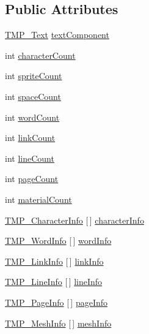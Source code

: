 \subsection*{Public Attributes}
\begin{DoxyCompactItemize}
\item 
\mbox{\hyperlink{class_t_m_pro_1_1_t_m_p___text}{T\+M\+P\+\_\+\+Text}} \mbox{\hyperlink{class_t_m_pro_1_1_t_m_p___text_info_ab23d67636c516cc8bd985f7e0904d3d9}{text\+Component}}
\item 
int \mbox{\hyperlink{class_t_m_pro_1_1_t_m_p___text_info_a8e78eb9b556174b94f41918799a1b85d}{character\+Count}}
\item 
int \mbox{\hyperlink{class_t_m_pro_1_1_t_m_p___text_info_a0b176c87b6ba6fd91c22adb1bd7f780a}{sprite\+Count}}
\item 
int \mbox{\hyperlink{class_t_m_pro_1_1_t_m_p___text_info_ae7e41800a8dba2853e71bd357e79319f}{space\+Count}}
\item 
int \mbox{\hyperlink{class_t_m_pro_1_1_t_m_p___text_info_ac2bb20330e0efa71d8fecd90c783fe65}{word\+Count}}
\item 
int \mbox{\hyperlink{class_t_m_pro_1_1_t_m_p___text_info_aeab9550ef458ae133cd9d8bcb6c27a43}{link\+Count}}
\item 
int \mbox{\hyperlink{class_t_m_pro_1_1_t_m_p___text_info_a7a77f5e9e979808b269dae5501bb7697}{line\+Count}}
\item 
int \mbox{\hyperlink{class_t_m_pro_1_1_t_m_p___text_info_a201730f545fe082335a1bb5a7ae8cd87}{page\+Count}}
\item 
int \mbox{\hyperlink{class_t_m_pro_1_1_t_m_p___text_info_a7658d04113158c9974dc48c867efd6d5}{material\+Count}}
\item 
\mbox{\hyperlink{struct_t_m_pro_1_1_t_m_p___character_info}{T\+M\+P\+\_\+\+Character\+Info}} \mbox{[}$\,$\mbox{]} \mbox{\hyperlink{class_t_m_pro_1_1_t_m_p___text_info_ae539414faa4f544ff7a08c2ef5c36d25}{character\+Info}}
\item 
\mbox{\hyperlink{struct_t_m_pro_1_1_t_m_p___word_info}{T\+M\+P\+\_\+\+Word\+Info}} \mbox{[}$\,$\mbox{]} \mbox{\hyperlink{class_t_m_pro_1_1_t_m_p___text_info_a5d98e3b54820b5c1368b8e9ee8205f5c}{word\+Info}}
\item 
\mbox{\hyperlink{struct_t_m_pro_1_1_t_m_p___link_info}{T\+M\+P\+\_\+\+Link\+Info}} \mbox{[}$\,$\mbox{]} \mbox{\hyperlink{class_t_m_pro_1_1_t_m_p___text_info_a1fb220afd41c977cfaf07e2254800947}{link\+Info}}
\item 
\mbox{\hyperlink{struct_t_m_pro_1_1_t_m_p___line_info}{T\+M\+P\+\_\+\+Line\+Info}} \mbox{[}$\,$\mbox{]} \mbox{\hyperlink{class_t_m_pro_1_1_t_m_p___text_info_a49c8350b475242f1a52b6a2a05e2d49d}{line\+Info}}
\item 
\mbox{\hyperlink{struct_t_m_pro_1_1_t_m_p___page_info}{T\+M\+P\+\_\+\+Page\+Info}} \mbox{[}$\,$\mbox{]} \mbox{\hyperlink{class_t_m_pro_1_1_t_m_p___text_info_a0da408eca7321046fa78659e3022ce4d}{page\+Info}}
\item 
\mbox{\hyperlink{struct_t_m_pro_1_1_t_m_p___mesh_info}{T\+M\+P\+\_\+\+Mesh\+Info}} \mbox{[}$\,$\mbox{]} \mbox{\hyperlink{class_t_m_pro_1_1_t_m_p___text_info_a944c68132d16336aee460c0d99e78442}{mesh\+Info}}
\end{DoxyCompactItemize}


